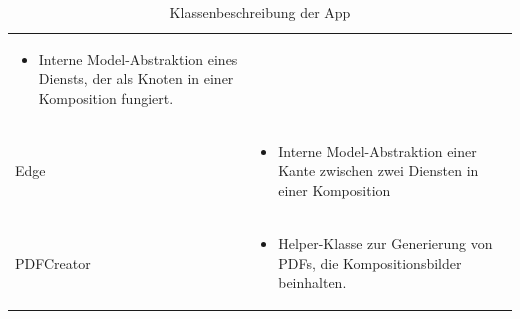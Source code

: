 \begin{table}[h]
\begin{tabularx}{\textwidth}{X X}
\begin{itemize}
		\item Interne Model-Abstraktion eines Diensts, der als Knoten in einer Komposition fungiert. 
		\end{itemize}\\
		\rowcolor[HTML]{E7E7E7} 
		Edge & \begin{itemize}
				 \item Interne Model-Abstraktion einer Kante zwischen zwei Diensten in einer Komposition 
				 \end{itemize} \\
		PDFCreator & \begin{itemize}
\item Helper-Klasse zur Generierung von PDFs, die Kompositionsbilder beinhalten. \end{itemize}\\	\end{tabularx}
	\caption{Klassenbeschreibung der App}
	\label{table:klassenbeschreibung-a}
\end{table}

